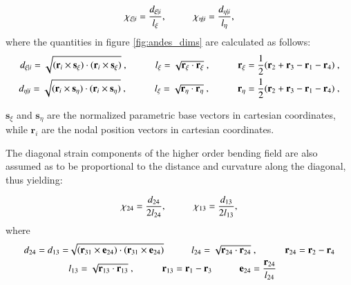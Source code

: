 \begin{equation} 
\chi_{\xi | i} = \frac{d_{\xi | i}}{l_\xi},
\hspace{10mm}
\chi_{\eta | i} = \frac{d_{\eta | i}}{l_\eta},
\label{equation12}
\end{equation}
where the quantities in figure \ref{fig:andes_dims} are calculated as follows:
\begin{align*} 
	d_{\xi | i} = \sqrt{(\mathbf{r}_i \times \mathbf{s_\xi}) \cdot (\mathbf{r}_i \times \mathbf{s_\xi})}\ ,
	\hspace{10mm}
	l_\xi = \sqrt{\mathbf{r_\xi} \cdot \mathbf{r_\xi}}\ ,
	\hspace{10mm} 
	\mathbf{r_\xi} = \frac{1}{2} ( \mathbf{r}_2 + \mathbf{r}_3 - \mathbf{r}_1 - \mathbf{r}_4 )\ , \\
	d_{\eta | i} = \sqrt{(\mathbf{r}_i \times \mathbf{s_\eta}) \cdot (\mathbf{r}_i \times \mathbf{s_\eta})}\ ,
	\hspace{10mm}
	l_\xi = \sqrt{\mathbf{r_\eta} \cdot \mathbf{r_\eta}}\ ,
	\hspace{10mm}
	\mathbf{r_\eta} = \frac{1}{2} ( \mathbf{r}_2 + \mathbf{r}_3 - \mathbf{r}_1 - \mathbf{r}_4 )\ ,
\end{align*}

$\mathbf{s}_\xi$ and $\mathbf{s}_\eta$ are the normalized parametric base vectors in cartesian coordinates, while $\mathbf{r}_i$ are the nodal position vectors in cartesian coordinates.

The diagonal strain components of the higher order bending field are also assumed as to be proportional to the distance and curvature along the diagonal, thus yielding:  

\begin{equation} 
\chi_{24} = \frac{d_{24}}{2 l_{24}},
\hspace{10mm}
\chi_{13} = \frac{d_{13}}{2 l_{13}},
\label{equation12chi24}
\end{equation}
where
\begin{align*} 
\begin{split}
	d_{24} = d_{13} = & \sqrt{(\mathbf{r}_{31} \times \mathbf{e}_{24}) \cdot (\mathbf{r}_{31} \times \mathbf{e}_{24})} \hspace{10mm}
	l_{24} = \sqrt{\mathbf{r}_{24} \cdot \mathbf{r}_{24}}\ ,
	\hspace{10mm}
	\mathbf{r}_{24} = \mathbf{r}_2 - \mathbf{r}_4 \\
	& l_{13} = \sqrt{\mathbf{r}_{13} \cdot \mathbf{r}_{13}}\ ,
	\hspace{10mm}
	\mathbf{r}_{13} = \mathbf{r}_1 - \mathbf{r}_3
	\hspace{10mm}
	\mathbf{e}_{24} = \frac{\mathbf{r}_{24}}{l_{24}}
	\end{split}
\end{align*}

